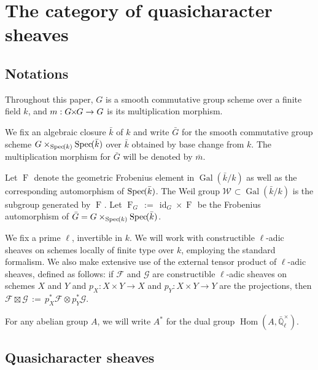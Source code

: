 \documentclass[10pt]{amsart}
\theoremstyle{plain}
\theoremstyle{definition}
\theoremstyle{remark}
\newcommand{\EE}{\mathbb{\bar Q}_\ell}
\newcommand{\bFq}{\bar{k}}
\newcommand{\Fq}{k}
\newcommand{\EEx}{\EE^\times}
\newcommand{\Weil}[1]{\mathcal{W}_{#1}}
\DeclareMathOperator{\Gal}{Gal}
\newcommand{\Frob}[1]{\operatorname{F}_{#1}}
\DeclareMathOperator{\Hom}{Hom}
\DeclareMathOperator{\id}{id}
\newcommand{\Spec}[1]{{\operatorname{Spec}\hskip-1pt( #1 )}}
\newcommand{\ceq}{{\, :=\, }}
\newcommand{\bm}{\bar{m}}
\newcommand{\bG}{\bar{G}}
\newcommand{\tight}[3]{\hspace{-#1pt}{#2}\hspace{-#3pt}}
\newcommand{\GxG}{\text{$G \tight{1}{\times}{1} G$}}
\begin{document}
\section{The category of quasicharacter sheaves} \label{sec:category}


\subsection{Notations}\label{ssec:notation}

Throughout this paper, $G$ is a smooth commutative group scheme
over a finite field $\Fq$, and $m : \GxG\to G$ is its multiplication morphism.

We fix an algebraic closure $\bFq$ of $\Fq$ and write $\bG$ for the
smooth commutative group scheme $G \times_{\Spec{\Fq}} \Spec{\bFq}$ over $\bFq$
obtained by base change from $k$. The multiplication morphism for $\bG$ will be denoted by $\bm$.

Let $\Frob{}$ denote the geometric Frobenius element in $\Gal(\bFq/\Fq)$ as
well as the corresponding automorphism of $\Spec{\bFq}$. The Weil group
$\Weil{}\subset \Gal(\bFq/\Fq)$ is the subgroup generated by $\Frob{}$.
Let $\Frob{G} \ceq \id_{G} \times \Frob{}$ be the Frobenius automorphism of $\bG = G \times_{\Spec{\Fq}} \Spec{\bFq}$.

We fix a prime $\ell$, invertible in $\Fq$.
We will work with constructible $\ell$-adic sheaves 
on schemes locally of finite type over $\Fq$, employing the standard formalism.
We also make extensive use of the external tensor product of $\ell$-adic sheaves,
defined as follows: if $\mathcal{F}$ and $\mathcal{G}$ are constructible $\ell$-adic
sheaves on schemes $X$ and $Y$ and $p_X : X\times Y\to X$ and $p_Y : X\times Y \to Y$
are the projections, then $\mathcal{F}\boxtimes \mathcal{G} \ceq p_X^* \mathcal{F} \otimes p_Y^*\mathcal{G}$.

For any abelian group $A$, we will write $A^*$ for the dual group $\Hom(A, \EEx)$.

\subsection{Quasicharacter sheaves}\label{ssec:category}
\end{document}
